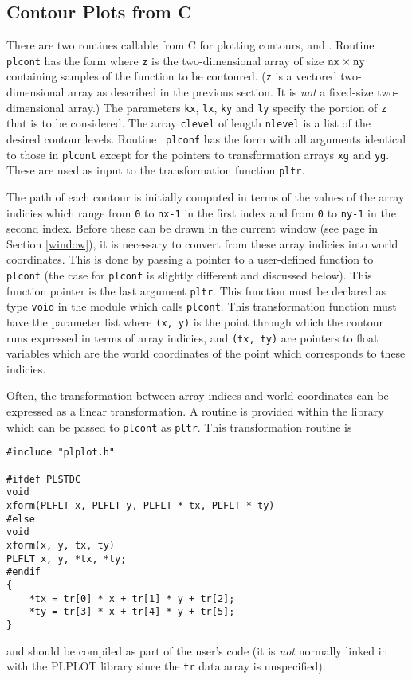 
\subsection {Contour Plots from C}

There are two routines callable from C for plotting contours, 
and .  Routine {\tt plcont} has the form 
where {\tt z} is the two-dimensional
array of size ${\tt nx}\times{\tt ny}$ containing samples of the function to
be contoured.  ({\tt z} is a vectored two-dimensional array as described in
the previous section.  It is {\em not\/} a fixed-size two-dimensional
array.) The parameters {\tt kx}, {\tt lx}, {\tt ky} and {\tt ly} specify the
portion of {\tt z} that is to be considered.  The array {\tt clevel} of
length {\tt nlevel} is a list of the desired contour levels.  Routine {\tt
plconf} has the form  with all arguments identical to those in {\tt plcont} except
for the pointers to transformation arrays {\tt xg} and {\tt yg}.  These are
used as input to the transformation function {\tt pltr}.

The path of each contour is initially computed in terms of the values of the
array indicies which range from {\tt 0} to {\tt nx-1} in the
first index and from
{\tt 0} to {\tt ny-1} in the second index.
Before these can be drawn in the current
window (see page \pageref{window} in Section \ref{window}), it is
necessary to
convert from these array indicies into world coordinates. This is done by
passing a pointer to a user-defined function to {\tt plcont} (the case for
{\tt plconf} is slightly different and discussed below).  This
function pointer is the last argument {\tt pltr}.
This function must be declared as type {\tt void} in the
module which calls {\tt plcont}. This transformation function
must have the parameter list
where {\tt (x, y)}
is the point through which the contour runs expressed in terms of array
indicies, and {\tt (tx, ty)} are pointers to float variables which are the
world coordinates of the point which corresponds to these indicies.

Often, the transformation between array indices and world coordinates can be
expressed as a linear transformation.  A routine is provided within the
library which can be passed to {\tt plcont} as {\tt pltr}.  This
transformation routine is
\begin{verbatim}
#include "plplot.h"

#ifdef PLSTDC
void 
xform(PLFLT x, PLFLT y, PLFLT * tx, PLFLT * ty)
#else
void 
xform(x, y, tx, ty)
PLFLT x, y, *tx, *ty;
#endif
{
    *tx = tr[0] * x + tr[1] * y + tr[2];
    *ty = tr[3] * x + tr[4] * y + tr[5];
}
\end{verbatim}
and should be compiled as part of the user's code (it is {\em not\/}
normally linked in with the PLPLOT library since the {\tt tr} data array is
unspecified).

